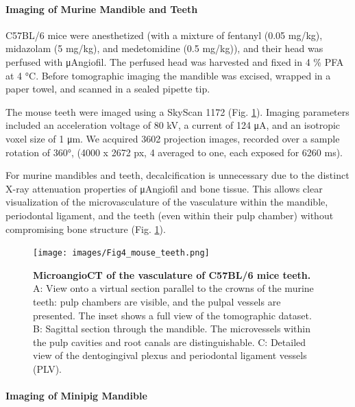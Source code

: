 \hypertarget{imaging-of-murine-mandible-and-teeth}{%
\paragraph{Imaging of Murine Mandible and Teeth}\label{imaging-of-murine-mandible-and-teeth}}

C57BL/6 mice were anesthetized (with a mixture of fentanyl (0.05 mg/kg), midazolam (5 mg/kg), and medetomidine (0.5 mg/kg)), and their head was perfused with μAngiofil.
The perfused head was harvested and fixed in 4 \% PFA at 4 °C.
Before tomographic imaging the mandible was excised, wrapped in a paper towel, and scanned in a sealed pipette tip.

The mouse teeth were imaged using a SkyScan 1172 (Fig. \ref{fig:4}).
Imaging parameters included an acceleration voltage of 80 kV, a current of 124 μA, and an isotropic voxel size of 1 μm.
We acquired 3602 projection images, recorded over a sample rotation of 360°, (4000 x 2672 px, 4 averaged to one, each exposed for 6260 ms).

For murine mandibles and teeth, decalcification is unnecessary due to the distinct X-ray attenuation properties of μAngiofil and bone tissue.
This allows clear visualization of the microvasculature of the vasculature within the mandible, periodontal ligament, and the teeth (even within their pulp chamber) without compromising bone structure (Fig. \ref{fig:4}).

\begin{figure}
\hypertarget{fig:4}{%
\centering
\texttt{[image: images/Fig4\_mouse\_teeth.png]}
\caption{\textbf{MicroangioCT of the vasculature of C57BL/6 mice teeth.}
A: View onto a virtual section parallel to the crowns of the murine teeth: pulp chambers are visible, and the pulpal vessels are presented.
The inset shows a full view of the tomographic dataset.
B: Sagittal section through the mandible.
The microvessels within the pulp cavities and root canals are distinguishable.
C: Detailed view of the dentogingival plexus and periodontal ligament vessels (PLV).}\label{fig:4}
}
\end{figure}

\hypertarget{imaging-of-minipig-mandible}{%
\paragraph{Imaging of Minipig Mandible}\label{imaging-of-minipig-mandible}}

